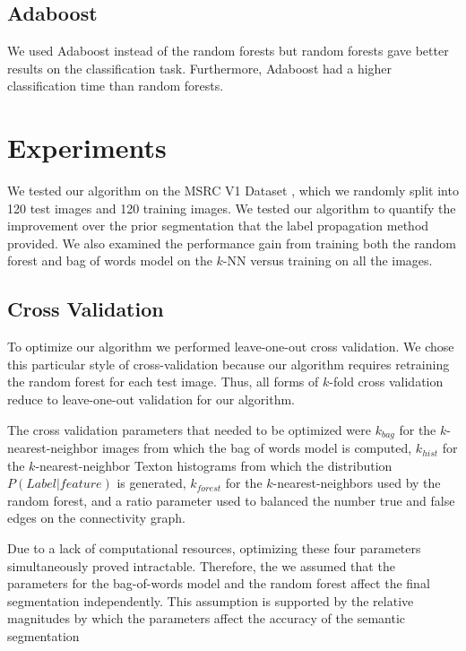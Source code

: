 \documentclass{article} %
\begin{document}
\subsection{Adaboost}
We used Adaboost \cite{Freund96experimentswith} instead of the random forests but random forests gave better results on the classification task. Furthermore, Adaboost had a higher classification time than random forests.



\section{Experiments}
\label{sec:Exp}

We tested our algorithm on the MSRC V1 Dataset \cite{MSRC}, which we randomly split into 120 test images and 120 training images.
We tested our algorithm to quantify the improvement over the prior segmentation that the label propagation method provided. We also examined the performance gain from training both the random forest and bag of words model on the $k$-NN versus training on all the images.

\subsection{Cross Validation}
\label{sec:cross}

To optimize our algorithm we performed leave-one-out cross validation. We chose this particular style of cross-validation because our algorithm requires retraining the random forest for each test image. Thus, all forms of $k$-fold cross validation reduce to leave-one-out validation for our algorithm.

The cross validation parameters that needed to be optimized were $k_{bag}$ for the $k$-nearest-neighbor images from which the bag of words model is computed, $k_{hist}$ for the $k$-nearest-neighbor Texton histograms from which the distribution $P(Label | feature)$ is generated, $k_{forest}$ for the $k$-nearest-neighbors used by the random forest, and a ratio parameter used to balanced the number true and false edges on the connectivity graph. 

Due to a lack of computational resources, optimizing these four parameters simultaneously proved intractable. Therefore, the we assumed that the parameters for the bag-of-words model and the random forest affect the final segmentation independently. This assumption is supported by the relative magnitudes by which the parameters affect the accuracy of the semantic segmentation
\end{document}
